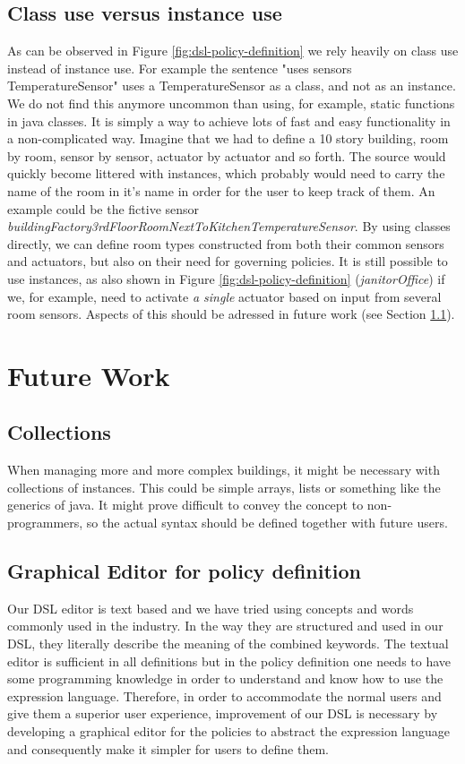 \documentclass{llncs}
\begin{document}
\subsection{Class use versus instance use}
As can be observed in Figure \ref{fig:dsl-policy-definition} we rely heavily on class use instead of instance use. For example the sentence "uses sensors TemperatureSensor" uses a TemperatureSensor as a class, and not as an instance. We do not find this anymore uncommon than using, for example, static functions in java classes. It is simply a way to achieve lots of fast and easy functionality in a non-complicated way. Imagine that we had to define a 10 story building, room by room, sensor by sensor, actuator by actuator and so forth. The source would quickly become littered with instances, which probably would need to carry the name of the room in it's name in order for the user to keep track of them. An example could be the fictive sensor \textit{buildingFactory3rdFloorRoomNextToKitchenTemperatureSensor}. By using classes directly, we can define room types constructed from both their common sensors and actuators, but also on their need for governing policies. It is still possible to use instances, as also shown in Figure \ref{fig:dsl-policy-definition} (\textit{janitorOffice}) if we, for example, need to activate \textit{a single} actuator based on input from several room sensors. Aspects of this should be adressed in future work (see Section \ref{subsec:collections}).

\section{Future Work}\label{subsec:futurework}

\subsection{Collections}\label{subsec:collections}
When managing more and more complex buildings, it might be necessary with collections of instances. This could be simple arrays, lists or something like the generics of java. It might prove difficult to convey the concept to non-programmers, so the actual syntax should be defined together with future users.

\subsection{Graphical Editor for policy definition}\label{subsec:graphicaleditor}
Our DSL editor is text based and we have tried using concepts and words commonly used in the industry. In the way they are structured and used in our DSL, they literally describe the meaning of the combined keywords. The textual editor is sufficient in all definitions but in the policy definition one needs to have some programming knowledge in order to understand and know how to use the expression language. Therefore, in order to accommodate the normal users and give them a superior user experience, improvement of our DSL is necessary by developing a graphical editor for the policies to abstract the expression language and consequently make it simpler for users to define them.
\end{document}
